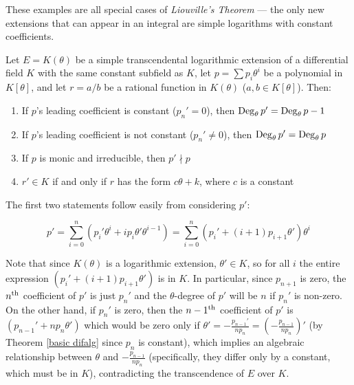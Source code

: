 
These examples are all special cases of {\it Liouville's Theorem} ---
the only new extensions that can appear in an integral are simple
logarithms with constant coefficients.

\theorem
Let $E=K(\theta)$ be a simple transcendental logarithmic extension of
a differential field $K$ with the same constant subfield as $K$, let
$p=\sum p_i \theta^i$ be a polynomial in $K[\theta]$, and let $r =
a/b$ be a rational function in $K(\theta)$ ($a, b \in K[\theta]$).
Then:

\begin{enumerate}
\item If $p$'s leading coefficient is constant ($p_n' = 0$), then ${\rm Deg}_\theta\, p' = {\rm Deg}_\theta\, p - 1$
\item If $p$'s leading coefficient is not constant ($p_n' \ne 0$), then ${\rm Deg}_\theta\, p' = {\rm Deg}_\theta\, p$
\item If $p$ is monic and irreducible, then $p' \nmid p$
\item $r' \in K$ if and only if $r$ has the form $c\theta + k$, where $c$ is a constant
\end{enumerate}

\proof

The first two statements follow easily from considering $p'$:

$$p'=\sum_{i=0}^n (p_i' \theta^i + i p_i \theta' \theta^{i-1}) = \sum_{i=0}^n
\left(p_i' + \left(i+1\right)p_{i+1} \theta'\right) \theta^i$$

Note that since $K(\theta)$ is a logarithmic extension, $\theta'
\in K$, so for all $i$ the entire expression $(p_i' + (i+1)p_{i+1} \theta')$
is in $K$.  In particular, since $p_{n+1}$ is zero, the $n^{\rm th}$
coefficient of $p'$ is just $p_n'$ and the $\theta$-degree of $p'$
will be $n$ if $p_n'$ is non-zero.  On the other hand, if $p_n'$ is
zero, then the $n-1^{\rm th}$ coefficient of $p'$ is $(p_{n-1}' + n
p_n \theta')$ which would be zero only if $\theta' =
-\frac{p_{n-1}'}{n p_n} = (-\frac{p_{n-1}}{n p_n})'$ (by Theorem
\ref{basic difalg} since $p_n$ is constant), which implies
an algebraic relationship between $\theta$ and $-\frac{p_{n-1}}{n
p_n}$ (specifically, they differ only by a constant, which must be in
$K$), contradicting the transcendence of $E$ over $K$.

